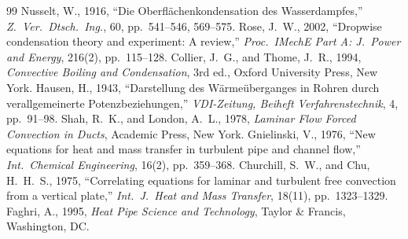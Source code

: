 \documentclass[11pt]{article}
\begin{document}
\begin{thebibliography}{99}
 Nusselt, W., 1916, ``Die Oberfl\"achenkondensation des Wasserdampfes,'' \textit{Z.\ Ver.\ Dtsch.\ Ing.}, 60, pp.~541--546, 569--575.
 Rose, J.~W., 2002, ``Dropwise condensation theory and experiment: A review,'' \textit{Proc.\ IMechE Part A: J.\ Power and Energy}, 216(2), pp.~115--128.
 Collier, J.~G., and Thome, J.~R., 1994, \textit{Convective Boiling and Condensation}, 3rd ed., Oxford University Press, New York.
 Hausen, H., 1943, ``Darstellung des W\"arme\"uberganges in Rohren durch verallgemeinerte Potenzbeziehungen,'' \textit{VDI-Zeitung, Beiheft Verfahrenstechnik}, 4, pp.~91--98.
 Shah, R.~K., and London, A.~L., 1978, \textit{Laminar Flow Forced Convection in Ducts}, Academic Press, New York.
 Gnielinski, V., 1976, ``New equations for heat and mass transfer in turbulent pipe and channel flow,'' \textit{Int.\ Chemical Engineering}, 16(2), pp.~359--368.
 Churchill, S.~W., and Chu, H.~H.~S., 1975, ``Correlating equations for laminar and turbulent free convection from a vertical plate,'' \textit{Int.\ J.\ Heat and Mass Transfer}, 18(11), pp.~1323--1329.
 Faghri, A., 1995, \textit{Heat Pipe Science and Technology}, Taylor \& Francis, Washington, DC.
\end{thebibliography}
\end{document}
